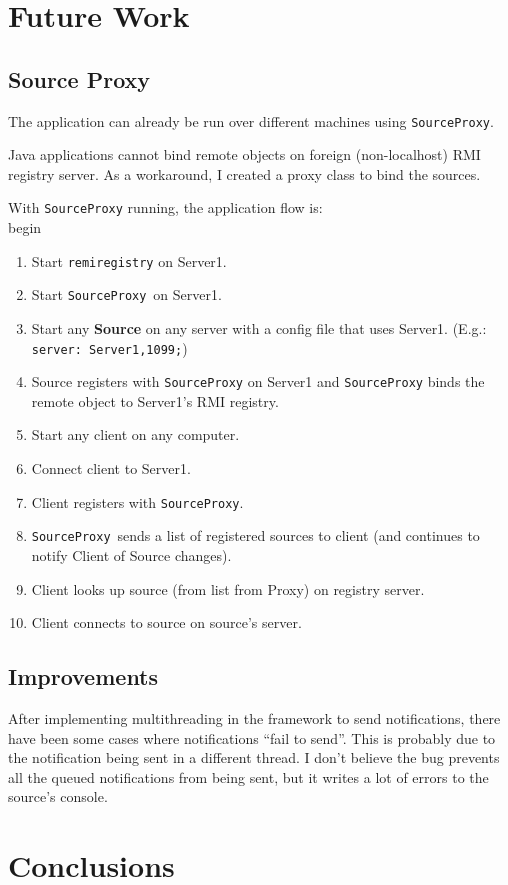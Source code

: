 \documentclass[a4paper]{article}
\begin{document}
\section{Future Work}
\subsection{Source Proxy}\label{sec:source_proxy}
The application can already be run over different machines using \texttt{SourceProxy}.

Java applications cannot bind remote objects on foreign (non-localhost) RMI registry server.
As a workaround, I created a proxy class to bind the sources.

With \texttt{SourceProxy} running, the application flow is:
\\begin{\begin{enumerate}
  \item Start \texttt{remiregistry} on Server1.
  \item Start \texttt{SourceProxy} on Server1.
  \item Start any \textbf{Source} on any server with a config file that uses Server1. (E.g.: \texttt{server: Server1,1099;})
  \item Source registers with \texttt{SourceProxy} on Server1 and \texttt{SourceProxy} binds the remote object to Server1's RMI registry.
  \item Start any client on any computer.
  \item Connect client to Server1.
  \item Client registers with \texttt{SourceProxy}.
  \item \texttt{SourceProxy} sends a list of registered sources to client (and continues to notify Client of Source changes).
  \item Client looks up source (from list from Proxy) on registry server.
  \item Client connects to source on source's server.
\end{enumerate}}

\subsection{Improvements}
After implementing multithreading in the framework to send notifications, there have been some cases where notifications ``fail to send''.
This is probably due to the notification being sent in a different thread.
I don't believe the bug prevents all the queued notifications from being sent, but it writes a lot of errors to the source's console.

\section{Conclusions}
\end{document}
